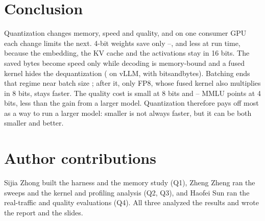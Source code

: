 \section{Conclusion}
\label{sec:conclusion}
Quantization changes memory, speed and quality, and on one consumer GPU each change limits the next.
4-bit weights save only \WtNFSeven--\WtAWQSeven, and less at run time, because the embedding, the KV
cache and the activations stay in 16 bits. The saved bytes become speed only while decoding is
memory-bound and a fused kernel hides the dequantization (\AWQspeedup{} on vLLM, \NFsevenB{} with
bitsandbytes). Batching ends that regime near batch size \AWQcross; after it, only FP8, whose fused
kernel also multiplies in 8 bits, stays faster. The quality cost is small at 8 bits and \MFourAbsMin--\MFourAbsMax{}
MMLU points at 4 bits, less than the gain from a larger model. Quantization therefore pays off most as
a way to run a larger model: smaller is not always faster, but it can be both smaller and better.

\section*{Author contributions}
Sijia Zhong built the harness and the memory study (Q1), Zheng Zheng ran the sweeps and the kernel
and profiling analysis (Q2, Q3), and Haofei Sun ran the real-traffic and quality evaluations (Q4). All
three analyzed the results and wrote the report and the slides.
